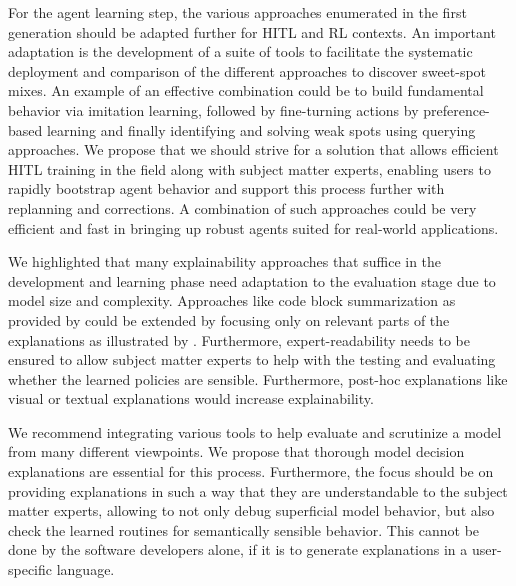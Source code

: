 \documentclass[twoside,11pt]{article}
\begin{document}
For the agent learning step, the various approaches enumerated in the first generation should be adapted further for HITL and RL contexts. An important adaptation is the development of a suite of tools to facilitate the systematic deployment and comparison of the different approaches to discover sweet-spot mixes. An example of an effective combination could be to build fundamental behavior via imitation learning, followed by fine-turning actions by preference-based learning and finally identifying and solving weak spots using querying approaches. We propose that we should strive for a solution that allows efficient HITL training in the field along with subject matter experts, enabling users to rapidly bootstrap agent behavior and support this process further with replanning and corrections. A combination of such approaches could be very efficient and fast in bringing up robust agents suited for real-world applications.


We highlighted that many explainability approaches that suffice in the development and learning phase need adaptation to the evaluation stage due to model size and complexity. Approaches like code block summarization as provided by \citet{VermaEtAl:2018:ProgrammaticallyInterpretableRL} could be extended by focusing only on relevant parts of the explanations as illustrated by \citet{Vu:2020:PGMExplainer}. Furthermore, expert-readability needs to be ensured to allow subject matter experts to help with the testing and evaluating whether the learned policies are sensible.
Furthermore, post-hoc explanations like visual \citep{DBLP:journals/corr/abs-1912-12191,DBLP:journals/corr/abs-1912-05743} or textual \citep{fukuchi2017autonomous,HayesShah:2017:AutonomousPolicyExplanation} explanations would increase explainability.

We recommend integrating various tools to help evaluate and scrutinize a model from many different viewpoints. We propose that thorough model decision explanations are essential for this process. Furthermore, the focus should be on providing explanations in such a way that they are understandable to the subject matter experts, allowing to not only debug superficial model behavior, but also check the learned routines for semantically sensible behavior. This cannot be done by the software developers alone, if it is to generate explanations in a user-specific language.

\end{document}
